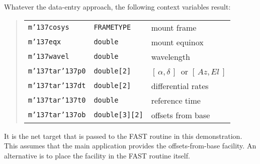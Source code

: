 \documentclass[12pt,fleqn,twoside]{article}
\renewcommand{\_}{{\tt\char'137}}     %
\newcommand{\radec}     {$[\,\alpha,\delta\,]$}
\newcommand{\azel}      {$[\,Az,El~]$}
\begin{document}
Whatever the data-entry approach, the following context variables result:
\begin{quote}
\begin{tabular}{lll}
{\tt m\_cosys} & {\tt FRAMETYPE} & {mount frame} \\
{\tt m\_eqx} & {\tt double} & {mount equinox} \\
{\tt m\_wavel} & {\tt double} & {wavelength} \\
{\tt m\_tar\_p0} & {\tt double[2]} & {\radec\ or \azel} \\
{\tt m\_tar\_dt} & {\tt double[2]} & {differential rates} \\
{\tt m\_tar\_t0} & {\tt double} & {reference time} \\
{\tt m\_tar\_ob} & {\tt double[3][2]} & {offsets from base} \\
\end{tabular}
\end{quote}
It is the net target that is passed to the FAST routine in this
demonstration.  This assumes that the main application provides
the offsets-from-base facility.  An alternative is to place the
facility in the FAST routine itself.
\end{document}
